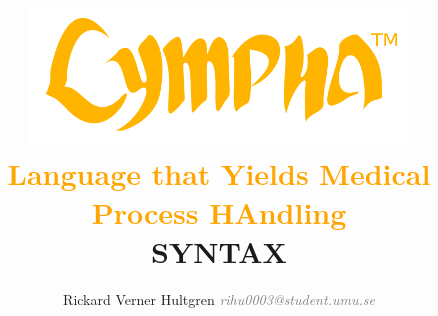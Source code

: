 \documentclass[15pt,a4paper,oneside]{report}
\begin{document}
\title{\vspace{-3cm}
{\includegraphics[width=0.75\textwidth]{logo.png}}\vspace{-0.6cm}\\ \textcolor{orange}{\large{\sc Language} {that} {\sc Yields Medical Process HAndling}}\vspace{0.3cm}\\{\Huge {\bf SYNTAX}}}
\author{\vspace{-0cm}Rickard Verner Hultgren \textit{\textcolor{grey}{rihu0003@student.umu.se}}\\\\
}
\end{document}
